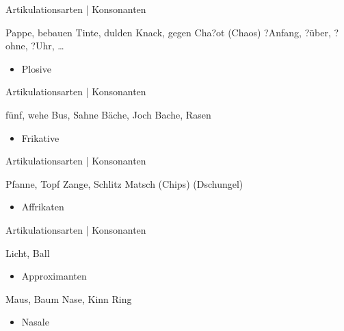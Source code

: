 \begin{frame}
  {Artikulationsarten | Konsonanten}
  \pause
  \begin{exe}
    \ex \alert{P}a\alert{pp}e, \alert{b}e\alert{b}auen
    \pause
    \ex \alert{T}in\alert{t}e, \alert{d}ul\alert{d}en
    \pause
    \ex \alert{K}na\alert{ck}, \alert{g}e\alert{g}en
    \pause
    \ex Cha\alert{?}ot (Chaos)
    \ex \alert{?}Anfang, \alert{?}über, \alert{?}ohne, \alert{?}Uhr, \dots
  \end{exe}
    \pause
    \Large
    \begin{itemize}
      \item[\ding{220}] \alert{Plosive}
    \end{itemize}
\end{frame}


\begin{frame}
  {Artikulationsarten | Konsonanten}
  \pause
  \begin{exe}
    \ex \alert{f}ün\alert{f}, \alert{w}ehe
    \pause
    \ex Bu\alert{s}, \alert{S}ahne
    \pause
    \ex Bä\alert{ch}e, \alert{J}och
    \pause
    \ex Ba\alert{ch}e, \alert{R}asen
  \end{exe}
    \pause
    \Large
    \begin{itemize}
      \item[\ding{220}] \alert{Frikative}
    \end{itemize}
\end{frame}

\begin{frame}
  {Artikulationsarten | Konsonanten}
  \pause
  \begin{exe}
    \ex \alert{Pf}anne, To\alert{pf} 
    \pause
    \ex \alert{Z}ange, Schli\alert{tz}
    \pause
    \ex Ma\alert{tsch} (\alert{Ch}ips)
    \pause
    \ex (\alert{Dsch}ungel)
  \end{exe}
    \pause
    \Large
    \begin{itemize}
      \item[\ding{220}] \alert{Affrikaten}
    \end{itemize}
\end{frame}

\begin{frame}
  {Artikulationsarten | Konsonanten}
  \pause
  \begin{exe}
    \ex \alert{L}icht, Ba\alert{ll}
  \end{exe}
    \pause
    \Large
    \begin{itemize}
      \item[\ding{220}] \alert{Approximanten}
    \end{itemize}
    \Zeile
  \pause
  \begin{exe}
    \ex \alert{M}aus, Bau\alert{m}
    \pause
    \ex \alert{N}ase, Ki\alert{nn}
    \pause
    \ex Ri\alert{ng}
  \end{exe}
    \pause
    \Large
    \begin{itemize}
      \item[\ding{220}] \alert{Nasale}
    \end{itemize}
\end{frame}


